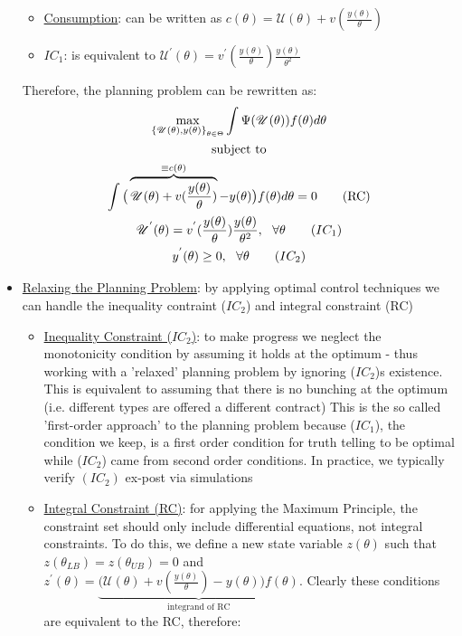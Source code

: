 \documentclass{article}
\begin{document}
\begin{itemize}
    \begin{itemize}
        \item  \underline{Consumption}: can be written as $c(\theta) = \mathcal{U}(\theta) + v(\frac{y(\theta)}{\theta})$
        \item  \underline{$IC_{1}$}: is equivalent to $\mathcal{U}^{'}(\theta) = v^{'}(\frac{y(\theta)}{\theta})\frac{y(\theta)}{\theta^{2}}$
    \end{itemize}
    Therefore, the planning problem can be rewritten as:
    \begin{gather*}
        \max_{\left\{ \mathcal{U}(\theta), y(\theta)\right\}_{\theta \in \Theta}} \int \Psi (\mathcal{U}(\theta))f(\theta) d \theta \\
        \text{subject to} \\
        \int \big(\overbrace{\mathcal{U}(\theta) + v(\frac{y(\theta)}{\theta})}^{ \equiv c(\theta)} - y(\theta) \big) f(\theta) d \theta = 0 \tag{RC} \\
        \mathcal{U}^{'}(\theta) = v^{'}(\frac{y(\theta)}{\theta}) \frac{y(\theta)}{\theta^{2}}, \ \ \forall \theta \tag{$IC_{1}$} \\
        y^{'}(\theta) \geq 0, \ \ \forall \theta \tag{$IC_{2}$}
    \end{gather*}
    \item  \underline{Relaxing the Planning Problem}: by applying optimal control techniques we can handle the inequality contraint ($IC_{2}$) and integral constraint (RC)
    \begin{itemize}
        \item  \underline{Inequality Constraint ($IC_{2}$)}: to make progress we neglect the monotonicity condition by assuming it holds at the optimum - thus working with a 'relaxed' planning problem by ignoring ($IC_{2}$)s existence. This is equivalent to assuming that there is no bunching at the optimum (i.e. different types are offered a different contract)
        \newline
        This is the so called 'first-order approach' to the planning problem because ($IC_{1}$), the condition we keep, is a first order condition for truth telling to be optimal while ($IC_{2}$) came from second order conditions. In practice, we typically verify $(IC_{2})$ ex-post via simulations
        \item  \underline{Integral Constraint (RC)}: for applying the Maximum Principle, the constraint set should only include differential equations, not integral constraints. To do this, we define a new state variable $z(\theta)$ such that $z(\theta_{LB}) = z(\theta_{UB}) = 0$ and $z^{'}(\theta) = \underbrace{\big(\mathcal{U}(\theta) + v(\frac{y(\theta)}{\theta}) - y(\theta) \big) f(\theta)}_{\text{integrand of RC}}$. Clearly these conditions are equivalent to the RC, therefore:

\end{itemize}
\end{itemize}
\end{document}
